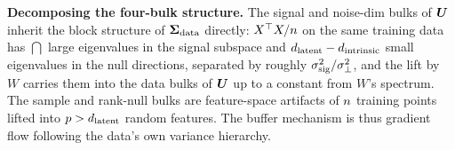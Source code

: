 \textbf{Decomposing the four-bulk structure.}
The signal and noise-dim bulks of $\bm{U}$ inherit the block
structure of $\bm{\Sigma}_{\mathrm{data}}$ directly: $X^\top X / n$ on the same
training data has $\dint$ large eigenvalues in the signal subspace
and $d_{\mathrm{latent}} - d_{\mathrm{intrinsic}}$ small eigenvalues in the null directions,
separated by roughly $\sigma_{\mathrm{sig}}^2 / \sigma_{\perp}^2$, and the lift by $W$
carries them into the data bulks of $\bm{U}$ up to a constant from
$W$'s spectrum. The sample and rank-null bulks are feature-space
artifacts of $n$ training points lifted into
$p > d_{\mathrm{latent}}$ random features. The buffer mechanism is thus
gradient flow following the data's own variance hierarchy.

%


